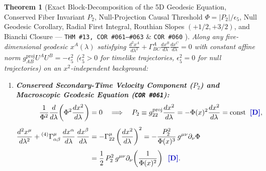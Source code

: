 \documentclass[11pt,a4paper]{article}
\newcommand{\catD}{\text{\textbf{\textcolor{blue!75!black}{[D]}}}}
\theoremstyle{definition}
\theoremstyle{plain}
\newtheorem{theorem}[axiom]{Theorem}
\theoremstyle{remark}
\begin{document}
\begin{theorem}[Exact Block-Decomposition of the 5D Geodesic Equation, Conserved Fiber Invariant $P_2$, Null-Projection Causal Threshold $\Phi = |P_2|/\epsilon_5$, Null Geodesic Corollary, Radial First Integral, Routhian Slopes $(+1/2, +3/2)$, and Bianchi Closure --- \texttt{THM~\#13, COR~\#061--\#063} \& \texttt{COR~\#060} \catD]\label{thm:c3_geodesic_decomposition}\label{thm:c3_5d_geodesic_splitting}\label{thm:c3_rescaled_geodesic_bianchi}\label{thm:c3_universal_coupling}
Along any five-dimensional geodesic $x^A(\lambda)$ satisfying $\frac{d^2 x^A}{d\lambda^2} + \Gamma^A_{BC}\frac{dx^B}{d\lambda}\frac{dx^C}{d\lambda} = 0$ with constant affine norm $g_{AB}^{\mathrm{proj}}U^A U^B = -\epsilon_5^2$ ($\epsilon_5^2 > 0$ for timelike trajectories, $\epsilon_5^2 = 0$ for null trajectories) on an $x^2$-independent background:
\begin{enumerate}[label=(\roman*)]
  \item \textbf{Conserved Secondary-Time Velocity Component ($P_2$) and Macroscopic Geodesic Equation (\texttt{COR~\#061}):}
  \begin{align}
  \frac{1}{\Phi^2}\frac{d}{d\lambda}\!\left(\Phi^2\frac{dx^2}{d\lambda}\right) &= 0 \quad \Longrightarrow \quad
  P_2 \equiv g_{22}^{\mathrm{proj}}\frac{dx^2}{d\lambda} = -\Phi(x)^2\frac{dx^2}{d\lambda} = \mathrm{const} \;\;\catD, \label{eq:c3_p2_conserved} \\[4pt]
  \frac{d^2 x^\mu}{d\lambda^2} + {}^{(4)}\Gamma^\mu_{\alpha\beta}\,\frac{dx^\alpha}{d\lambda}\,\frac{dx^\beta}{d\lambda} &= -\Gamma^\mu_{22}\left(\frac{dx^2}{d\lambda}\right)^2 = -\frac{P_2^2}{\Phi(x)^3}\,g^{\mu\nu}\partial_\nu\Phi \nonumber \\[3pt]
  &= \frac{1}{2}\,P_2^2\,g^{\mu\nu}\partial_\nu\!\left(\frac{1}{\Phi(x)^2}\right) \;\;\catD. \label{eq:c3_macro_geodesic_affine}
  \end{align}


\end{enumerate}
\end{theorem}
\end{document}
